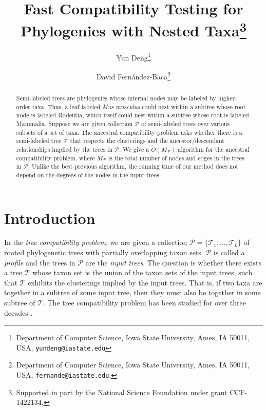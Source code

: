 \documentclass[11pt]{article}
\newcommand{\MP}{\ensuremath{M_\P}} \newcommand{\TG}{\ensuremath{\Gamma}} \newcommand{\incompatible}{\texttt{incompatible}}
\renewcommand{\P}{\ensuremath{\mathcal{P}}}
\newcommand{\T}{\ensuremath{\mathcal{T}}}
\theoremstyle{definition}
\begin{document}
\title{Fast Compatibility Testing for Phylogenies with Nested Taxa\thanks{Supported in part by the National Science Foundation under grant CCF-1422134.}}
\author{
Yun Deng\thanks{Department of Computer Science, Iowa State University, Ames, IA 50011, USA, {\tt yundeng@iastate.edu}}
\and
David Fern\'{a}ndez-Baca\thanks{Department of Computer Science, Iowa State University, Ames, IA 50011, USA, {\tt fernande@iastate.edu}. 
}
}

\date{\empty}

\maketitle

\begin{abstract}
Semi-labeled trees are phylogenies whose internal nodes may be labeled by higher-order taxa.  Thus, a leaf labeled \emph{Mus musculus} could nest within a subtree whose root node is labeled Rodentia, which itself could nest within a subtree whose root is labeled Mammalia.  
Suppose we are given collection $\P$ of semi-labeled trees over various subsets of a set of taxa.  The ancestral compatibility problem asks whether there is a semi-labeled tree $\T$ that respects the clusterings and the ancestor/descendant relationships implied by the trees in $\P$. 
We give a $\tilde{O}(\MP)$ algorithm for the ancestral compatibility problem, where $\MP$ is the total number of nodes and edges in the trees in $\P$.  Unlike the best previous algorithm, the running time of our method does not depend on the degrees of the nodes in the input trees.  
\end{abstract}

\section{Introduction}

In the \emph{tree compatibility problem}, we are given a collection $\P = \{\T_1, \ldots, \T_k\}$ of rooted phylogenetic trees with partially overlapping taxon sets. $\P$ is called a \emph{profile} and the trees in $\P$ are the \emph{input trees}.  The question is whether there exists a tree $\T$ whose taxon set is the union of the taxon sets of the input trees, such that $\T$ exhibits the clusterings implied by the input trees.  That is, if two taxa are together in a subtree of some input tree, then they must also be together in some subtree of $\T$. The tree compatibility problem has been studied for over three decades \cite{Aho81a,DengFB2016,HenzingerKingWarnow99,Steel92}.
\end{document}
